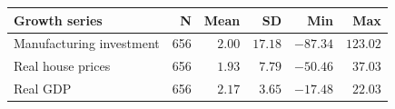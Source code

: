 \begin{tabularx}{\linewidth}{@{}Y r r r r r@{}}
\toprule
\textbf{Growth series} & \textbf{N} & \textbf{Mean} & \textbf{SD} & \textbf{Min} & \textbf{Max}\\
\midrule
Manufacturing investment & 656 & $2.00$ & $17.18$ & $-87.34$ & $123.02$\\
Real house prices & 656 & $1.93$ & $7.79$ & $-50.46$ & $37.03$\\
Real GDP & 656 & $2.17$ & $3.65$ & $-17.48$ & $22.03$\\
\bottomrule
\end{tabularx}
